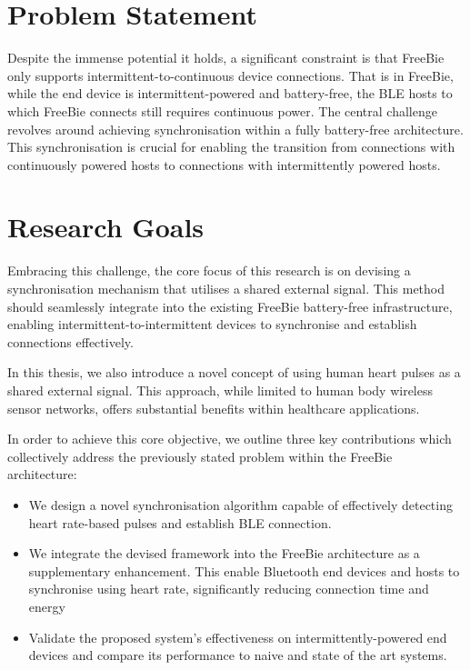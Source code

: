 \section{Problem Statement}
Despite the immense potential it holds, a significant constraint is that FreeBie only supports intermittent-to-continuous device connections. That is in FreeBie, while the end device is intermittent-powered and battery-free, the BLE hosts to which FreeBie connects still requires continuous power. The central challenge revolves around achieving synchronisation within a fully battery-free architecture. This synchronisation is crucial for enabling the transition from connections with continuously powered hosts to connections with intermittently powered hosts.

\section{Research Goals}
Embracing this challenge, the core focus of this research is on devising a synchronisation mechanism that utilises a shared external signal. This method should seamlessly integrate into the existing FreeBie battery-free infrastructure, enabling intermittent-to-intermittent devices to synchronise and establish connections effectively.
\vspace{1\baselineskip}

\noindent In this thesis, we also introduce a novel concept of using human heart pulses as a shared external signal. This approach, while limited to human body wireless sensor networks, offers substantial benefits within healthcare applications.
\vspace{1\baselineskip}

\noindent In order to achieve this core objective, we outline three key contributions which collectively address the previously stated problem within the FreeBie architecture:

\begin{itemize}
    \item We design a novel synchronisation algorithm capable of effectively detecting heart rate-based pulses and establish BLE connection.
    
    \item We integrate the devised framework into the FreeBie architecture as a supplementary enhancement. This enable Bluetooth end devices and hosts to synchronise using heart rate, significantly reducing connection time and energy
    
    \item Validate the proposed system's effectiveness on intermittently-powered end devices and compare its performance to naive and state of the art systems.
\end{itemize}
\vspace{8\baselineskip}

